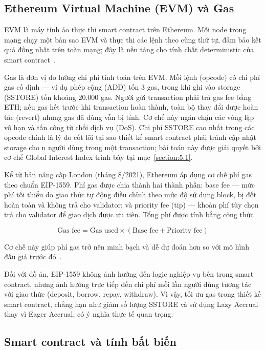 \documentclass[../DoAn.tex]{subfiles}
\begin{document}
\subsection{Ethereum Virtual Machine (EVM) và Gas}
\label{section:3.1.2}


EVM là máy tính ảo thực thi smart contract trên Ethereum. Mỗi node trong mạng chạy một bản sao EVM và thực thi các lệnh theo cùng thứ tự, đảm bảo kết quả đồng nhất trên toàn mạng; đây là nền tảng cho tính chất deterministic của smart contract~\cite{EthereumDocs}.

Gas là đơn vị đo lường chi phí tính toán trên EVM. Mỗi lệnh (opcode) có chi phí gas cố định --- ví dụ phép cộng (ADD) tốn 3 gas, trong khi ghi vào storage (SSTORE) tốn khoảng 20.000 gas. Người gửi transaction phải trả gas fee bằng ETH; nếu gas hết trước khi transaction hoàn thành, toàn bộ thay đổi được hoàn tác (revert) nhưng gas đã dùng vẫn bị tính. Cơ chế này ngăn chặn các vòng lặp vô hạn và tấn công từ chối dịch vụ (DoS). Chi phí SSTORE cao nhất trong các opcode chính là lý do cốt lõi tại sao thiết kế smart contract phải tránh cập nhật storage cho n người dùng trong một transaction; bài toán này được giải quyết bởi cơ chế Global Interest Index trình bày tại mục~\ref{section:5.1}.

Kể từ bản nâng cấp London (tháng 8/2021), Ethereum áp dụng cơ chế phí gas theo chuẩn EIP-1559. Phí gas được chia thành hai thành phần: base fee --- mức phí tối thiểu do giao thức tự động điều chỉnh theo mức độ sử dụng block, bị đốt hoàn toàn và không trả cho validator; và priority fee (tip) --- khoản phí tùy chọn trả cho validator để giao dịch được ưu tiên. Tổng phí được tính bằng công thức 

\begin{equation}
\text{Gas fee} = \text{Gas used} \times (\text{Base fee} + \text{Priority fee})
\label{eq:gas_fee}
\end{equation}

Cơ chế này giúp phí gas trở nên minh bạch và dễ dự đoán hơn so với mô hình đấu giá trước đó~\cite{EthereumDocs}.

Đối với đồ án, EIP-1559 không ảnh hưởng đến logic nghiệp vụ bên trong smart contract, nhưng ảnh hưởng trực tiếp đến chi phí mỗi lần người dùng tương tác với giao thức (deposit, borrow, repay, withdraw). Vì vậy, tối ưu gas trong thiết kế smart contract, chẳng hạn như giảm số lượng SSTORE và sử dụng Lazy Accrual thay vì Eager Accrual, có ý nghĩa thực tế quan trọng.

\subsection{Smart contract và tính bất biến}
\end{document}
